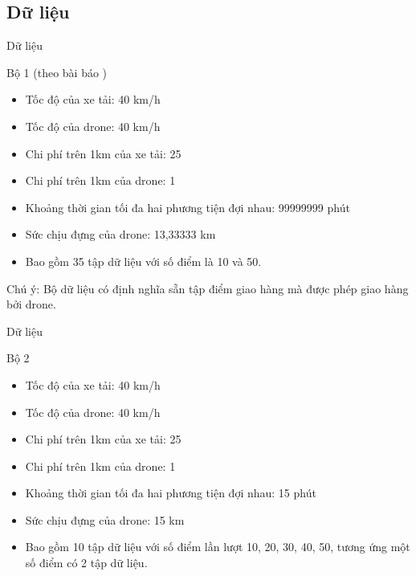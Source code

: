\documentclass[compress]{beamer}
\begin{document}
\subsection{Dữ liệu}
\begin{frame}{Dữ liệu}

\begin{block}{Bộ 1 (theo bài báo \cite{main})}
\begin{itemize}
\item Tốc độ của xe tải: 40 km/h
\item Tốc độ của drone: 40 km/h
\item Chi phí trên 1km của xe tải: 25
\item Chi phí trên 1km của drone: 1
\item Khoảng thời gian tối đa hai phương tiện đợi nhau: 99999999 phút
\item Sức chịu đựng của drone: 13,33333 km
\item Bao gồm 35 tập dữ liệu với số điểm là 10 và 50.
\end{itemize}
Chú ý: Bộ dữ liệu có định nghĩa sẵn tập điểm giao hàng mà được phép giao hàng bởi drone.

\end{block}


\end{frame}
\begin{frame}{Dữ liệu}
\begin{block}{Bộ 2}

\begin{itemize}
\item Tốc độ của xe tải: 40 km/h
\item Tốc độ của drone: 40 km/h
\item Chi phí trên 1km của xe tải: 25
\item Chi phí trên 1km của drone: 1
\item Khoảng thời gian tối đa hai phương tiện đợi nhau: 15 phút
\item Sức chịu đựng của drone: 15 km
\item Bao gồm 10 tập dữ liệu với số điểm lần lượt 10, 20, 30, 40, 50, tương ứng một số điểm có 2 tập dữ liệu. 
\end{itemize}

\end{block}
\end{frame}
\end{document}
